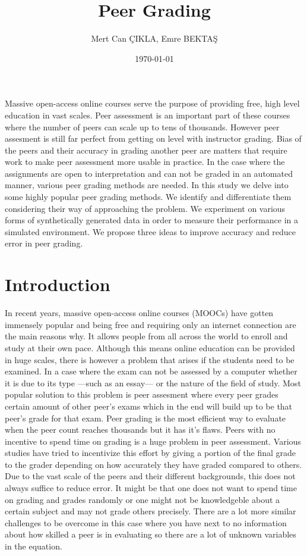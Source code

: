 \documentclass[a4paper]{article}
\title{Peer Grading}
\author{Mert Can ÇIKLA, Emre BEKTAŞ}
\date{\today}
\begin{document}
\maketitle
\abstract
Massive open-access online courses serve the purpose of providing free, high level education in
vast scales. Peer assessment is an important part of these courses where the number of peers can
scale up to tens of thousands. However peer assesment is still far perfect from getting on level with instructor grading. Bias of the peers and their accuracy in grading another peer are
matters that require work to make peer assessment more usable in practice. In the case where the assignments
are open to interpretation and can not be graded in an automated manner, various peer grading methods
are needed. In this study we delve into some highly popular peer grading methods. We identify and differentiate
them considering their way of approaching the problem. We experiment on various forms of synthetically generated data
in order to measure their performance in a simulated environment. We propose three ideas to improve accuracy and reduce error in peer grading.

\section{Introduction}
In recent years, massive open-access online courses (MOOCs) have gotten immensely popular and being free and requiring only an internet connection are the main reasons why. It allows people from all across the world to enroll and study at their own pace. Although this means online education can
be provided in huge scales, there is however a problem that arises if the students need to be examined. In a case where the exam can not be assessed by a computer whether it is due to its type ---such as an essay--- or the nature of the field of study. Most popular solution to this problem is
peer assesment where every peer grades certain amount of other peer's exams which in the end
will build up to be that peer's grade for that exam.
Peer grading is the most efficient way to evaluate when the peer count reaches thousands but it has it's flaws. Peers with no incentive to spend time on grading is a huge problem in peer assessment. Various studies \cite{Walsh14a,PiechHCDNK13,Alfaros13}have tried to incentivize this effort by giving a portion of the final grade to the grader depending on how accurately they have graded compared to others. Due to the vast scale of the peers and their different backgrounds, this does not always suffice to reduce error. It might be that one does not want to 
spend time on grading and grades randomly or one might not be knowledgeble about a certain
subject and may not grade others precisely. There are a lot more similar challenges to be
overcome in this case where you have next to no information about how skilled a peer 
is in evaluating so there are a lot of unknown variables in the equation.
\end{document}

